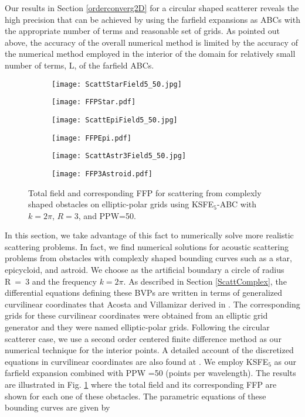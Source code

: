 \documentclass[final,3p,times,12pt]{elsarticle}
\begin{document}
Our results in Section \ref{orderconverg2D} for a circular shaped scatterer reveals the high precision that can be achieved by using the farfield expansions as ABCs with the appropriate number of terms and reasonable set of grids. As pointed out above, the accuracy of the overall numerical method is limited by the accuracy of the numerical method employed in the interior of the domain for relatively small number of terms, L, of the farfield ABCs. 
\begin{figure}[!h]
\begin{subfigure}{0.5\textwidth}
\texttt{[image: ScattStarField5\_50.jpg]} 
\end{subfigure}
\begin{subfigure}{0.5\textwidth}
\texttt{[image: FFPStar.pdf]}
\end{subfigure}
\begin{subfigure}{0.5\textwidth}
\texttt{[image: ScattEpiField5\_50.jpg]}
\end{subfigure}
\begin{subfigure}{0.5\textwidth}
\texttt{[image: FFPEpi.pdf]}
\end{subfigure}
\begin{subfigure}{0.5\textwidth}
\texttt{[image: ScattAstr3Field5\_50.jpg]}
\end{subfigure}
\begin{subfigure}{0.5\textwidth}
\texttt{[image: FFP3Astroid.pdf]}
\end{subfigure}
\caption{Total field and corresponding FFP for scattering from complexly shaped obstacles on elliptic-polar grids using KSFE$_5$-ABC with $k=2\pi$, $R=3$, and PPW=50.} 
\label{fig:ComplexObst}
\end{figure}
In this section, we take advantage of this fact to numerically solve more realistic scattering problems. In fact, we find numerical solutions for acoustic scattering problems from obstacles with complexly shaped bounding curves such as a star, epicycloid, and astroid. We choose as the artificial boundary a circle of radius R~=~3 and the frequency $k =2\pi$.
As described in Section \ref{ScattComplex}, the differential equations defining these BVPs are written in terms of generalized curvilinear coordinates that Acosta and Villamizar derived in 
\cite{JCP2010}. The corresponding grids for these curvilinear coordinates  were obtained from an elliptic grid generator and they were named elliptic-polar grids. Following the circular scatterer case, we use a second order centered finite difference method as our numerical technique for the interior points.  A detailed account of the discretized equations in curvilinear coordinates are also found at \cite{JCP2010}. We employ KSFE$_5$ as our farfield expansion combined with PPW =50 (points per wavelength).  The results are illustrated in Fig. \ref{fig:ComplexObst} where the total field and its corresponding FFP are shown for each one of these obstacles.  The parametric equations of these bounding curves are given by
\end{document}

